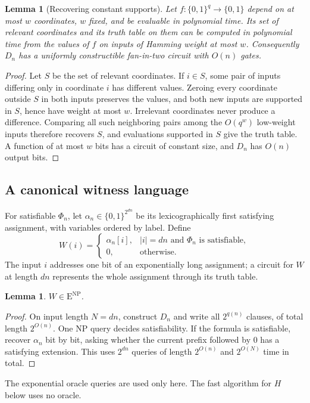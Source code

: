 \documentclass[11pt,reqno]{amsart}
\numberwithin{equation}{section}
\theoremstyle{plain}
\newtheorem{lemma}[theorem]{Lemma}
\theoremstyle{definition}
\theoremstyle{remark}
\newcommand{\ENP}{\mathrm E^{\mathrm{NP}}}
\begin{document}
\begin{lemma}[Recovering constant supports]\label{lem:support}
Let $f\colon\{0,1\}^q\to\{0,1\}$ depend on at most $w$ coordinates, $w$
fixed, and be evaluable in polynomial time. Its set of relevant coordinates
and its truth table on them can be computed in polynomial time from the
values of $f$ on inputs of Hamming weight at most $w$. Consequently $D_n$ has
a uniformly constructible fan-in-two circuit with $O(n)$ gates.
\end{lemma}
\begin{proof}
Let $S$ be the set of relevant coordinates. If $i\in S$, some pair of
inputs differing only in coordinate $i$ has different values. Zeroing every
coordinate outside $S$ in both inputs preserves the values, and both new
inputs are supported in $S$, hence have weight at most $w$. Irrelevant
coordinates never produce a difference. Comparing all such neighboring pairs
among the $O(q^w)$ low-weight inputs therefore recovers $S$, and evaluations
supported in $S$ give the truth table. A function of at most $w$ bits has a
circuit of constant size, and $D_n$ has $O(n)$ output bits.
\end{proof}

\subsection{A canonical witness language}
For satisfiable $\Phi_n$, let $\alpha_n\in\{0,1\}^{2^{dn}}$ be its
lexicographically first satisfying assignment, with variables ordered by
label. Define
\begin{equation}\label{eq:witness-language}
 W(i)=\begin{cases}
 \alpha_n[i],& |i|=dn \text{ and } \Phi_n \text{ is satisfiable},\\
 0,&\text{otherwise}.
 \end{cases}
\end{equation}
The input $i$ addresses one bit of an exponentially long assignment; a
circuit for $W$ at length $dn$ represents the whole assignment through its
truth table.

\begin{lemma}\label{lem:witness-class}
$W\in\ENP$.
\end{lemma}
\begin{proof}
On input length $N=dn$, construct $D_n$ and write all $2^{q(n)}$ clauses,
of total length $2^{O(n)}$. One NP query decides satisfiability. If the
formula is satisfiable, recover $\alpha_n$ bit by bit, asking whether the
current prefix followed by $0$ has a satisfying extension. This uses
$2^{dn}$ queries of length $2^{O(n)}$ and $2^{O(N)}$ time in total.
\end{proof}
The exponential oracle queries are used only here. The fast algorithm for $H$
below uses no oracle.
\end{document}
